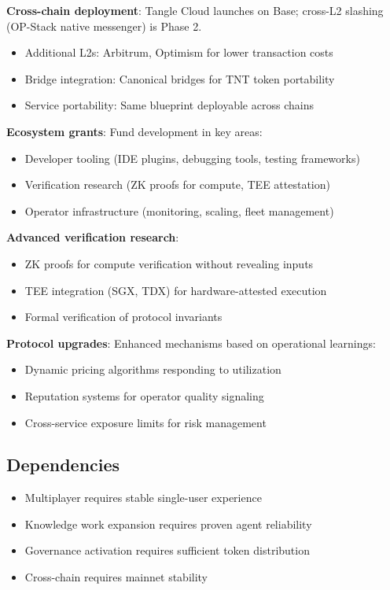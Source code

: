 \documentclass[11pt,a4paper]{article}
\begin{document}
\textbf{Cross-chain deployment}: Tangle Cloud launches on Base; cross-L2 slashing (OP-Stack native messenger) is Phase 2.
\begin{itemize}[noitemsep]
    \item Additional L2s: Arbitrum, Optimism for lower transaction costs
    \item Bridge integration: Canonical bridges for TNT token portability
    \item Service portability: Same blueprint deployable across chains
\end{itemize}

\textbf{Ecosystem grants}: Fund development in key areas:
\begin{itemize}[noitemsep]
    \item Developer tooling (IDE plugins, debugging tools, testing frameworks)
    \item Verification research (ZK proofs for compute, TEE attestation)
    \item Operator infrastructure (monitoring, scaling, fleet management)
\end{itemize}

\textbf{Advanced verification research}:
\begin{itemize}[noitemsep]
    \item ZK proofs for compute verification without revealing inputs
    \item TEE integration (SGX, TDX) for hardware-attested execution
    \item Formal verification of protocol invariants
\end{itemize}

\textbf{Protocol upgrades}: Enhanced mechanisms based on operational learnings:
\begin{itemize}[noitemsep]
    \item Dynamic pricing algorithms responding to utilization
    \item Reputation systems for operator quality signaling
    \item Cross-service exposure limits for risk management
\end{itemize}

\subsection{Dependencies}

\begin{itemize}[noitemsep]
    \item Multiplayer requires stable single-user experience
    \item Knowledge work expansion requires proven agent reliability
    \item Governance activation requires sufficient token distribution
    \item Cross-chain requires mainnet stability
\end{itemize}
\end{document}

